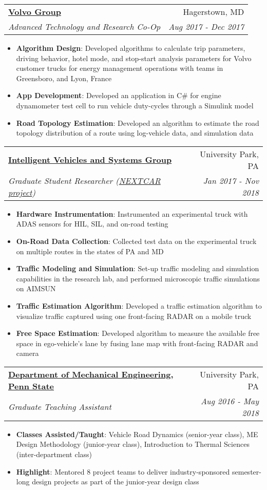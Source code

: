\documentclass[letterpaper,10.5pt]{article}
\makeatletter
\newcommand{\resumeItem}[2]{
  \item\small{
    \textbf{#1}{: #2 \vspace{-2pt}}
  }
}
\newcommand{\resumeSubheading}[4]{
  \vspace{-1pt}\item
    \begin{tabular*}{0.97\textwidth}{l@{\extracolsep{\fill}}r}
      \textbf{#1} & #2 \\
      \textit{\small#3} & \textit{\small #4} \\
    \end{tabular*}\vspace{-5pt}
}
\newcommand{\resumeItemListStart}{\begin{itemize}}
\newcommand{\resumeItemListEnd}{\end{itemize}\vspace{-1pt}}
\makeatother
\begin{document}
    \resumeSubheading
      {\href{https://www.volvotrucks.us/}{\color{blue}Volvo Group}}{Hagerstown, MD}
      {Advanced Technology and Research Co-Op}{Aug 2017 - Dec 2017}
      \resumeItemListStart
        \resumeItem{Algorithm Design}
          {Developed algorithms to calculate trip parameters, driving behavior, hotel mode, and stop-start analysis parameters for Volvo customer trucks for energy management operations with teams in Greensboro, and Lyon, France}
        \resumeItem{App Development}
          {Developed an application in C\# for engine dynamometer test cell to run vehicle    duty-cycles through a Simulink model}
        \resumeItem{Road Topology Estimation}
          {Developed an algorithm to estimate the road topology distribution of a route using log-vehicle data, and simulation data}
      \resumeItemListEnd
      
     \resumeSubheading
      {\href{https://www.mne.psu.edu/toboldlygo/}{\color{blue}Intelligent Vehicles and Systems Group}}{University Park, PA}
      {Graduate Student Researcher (\href{https://arpa-e.energy.gov/?q=arpa-e-programs/nextcar}{\color{blue}NEXTCAR project})}{Jan 2017 - Nov 2018}
      \resumeItemListStart
        \resumeItem{Hardware Instrumentation}
          {Instrumented an experimental truck with ADAS sensors for HIL, SIL, and on-road testing}
        \resumeItem{On-Road Data Collection}
          {Collected test data on the experimental truck on multiple routes in the states of PA and MD}
        \resumeItem{Traffic Modeling and Simulation}
          {Set-up traffic modeling and simulation capabilities in the research lab, and performed microscopic traffic simulations on AIMSUN}
        \resumeItem{Traffic Estimation Algorithm}
          {Developed a traffic estimation algorithm to visualize traffic captured using one front-facing RADAR on a mobile truck}
        \resumeItem{Free Space Estimation}
        {Developed algorithm to measure the available free space in ego-vehicle's lane by fusing lane map with front-facing RADAR and camera
        }
      \resumeItemListEnd
      
      \resumeSubheading
      {\href{https://www.me.psu.edu/}{\color{blue}Department of Mechanical Engineering, Penn State}}{University Park, PA}
      {Graduate Teaching Assistant}{Aug 2016 - May 2018}
      \resumeItemListStart
        \resumeItem{Classes Assisted/Taught}
          {Vehicle Road Dynamics (senior-year class), ME Design Methodology (junior-year class), Introduction to Thermal Sciences (inter-department class)}
        \resumeItem{Highlight}
          {Mentored 8 project teams to deliver industry-sponsored semester-long design projects as part of the junior-year design class}
      \resumeItemListEnd
      
\end{document}
